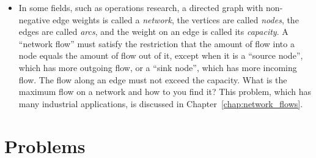 \begin{itemize}
\item In some fields, such as operations research, a directed graph
  with non-negative edge weights is called a \emph{network}, the
  vertices are called \emph{nodes}, the edges are called \emph{arcs},
  and the weight on an edge is called its \emph{capacity}. A
  ``network flow'' must satisfy the restriction that the amount of
  flow into a node equals the amount of flow out of it, except when it
  is a ``source node'', which has more outgoing flow, or a ``sink
  node'', which has more incoming flow. The flow along an edge must
  not exceed the capacity. What is the maximum flow on a network
  and how to you find it? This problem, which has many industrial
  applications, is discussed in Chapter~\ref{chap:network_flows}.
\end{itemize}



\section{Problems}

